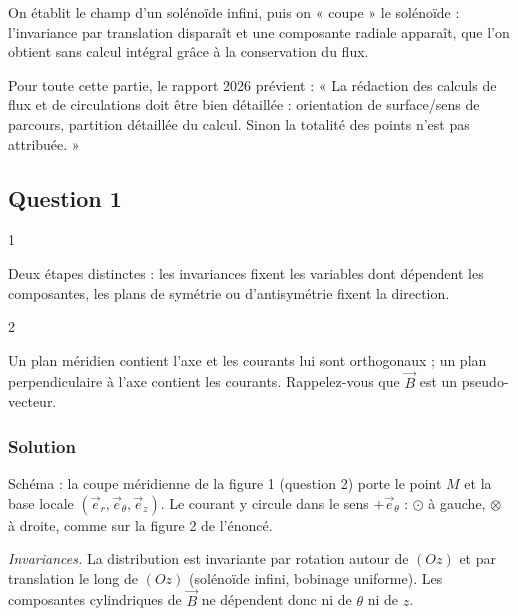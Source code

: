 \documentclass[11pt,a4paper]{article}
\begin{document}
On établit le champ d'un solénoïde infini, puis on « coupe » le solénoïde : l'invariance par translation disparaît et une composante radiale apparaît, que l'on obtient sans calcul intégral grâce à la conservation du flux.

\begin{jury}

Pour toute cette partie, le rapport 2026 prévient : « La rédaction des calculs de flux et de circulations doit être bien détaillée : orientation de surface/sens de parcours, partition détaillée du calcul. Sinon la totalité des points n'est pas attribuée. »

\end{jury}

\hypertarget{question-1}{%
\subsection{Question 1}\label{question-1}}

\begin{indication}{1}

Deux étapes distinctes : les invariances fixent les variables dont dépendent les composantes, les plans de symétrie ou d'antisymétrie fixent la direction.

\end{indication}

\begin{indication}{2}

Un plan méridien contient l'axe et les courants lui sont orthogonaux ; un plan perpendiculaire à l'axe contient les courants. Rappelez-vous que \(\vec B\) est un pseudo-vecteur.

\end{indication}

\hypertarget{solution}{%
\subsubsection{Solution}\label{solution}}

Schéma : la coupe méridienne de la figure 1 (question 2) porte le point \(M\) et la base locale \((\vec e_r,\vec e_\theta,\vec e_z)\).
Le courant y circule dans le sens \(+\vec e_\theta\) : \(\odot\) à gauche, \(\otimes\) à droite, comme sur la figure 2 de l'énoncé.

\emph{Invariances.} La distribution est invariante par rotation autour de \((Oz)\) et par translation le long de \((Oz)\) (solénoïde infini, bobinage uniforme). Les composantes cylindriques de \(\vec B\) ne dépendent donc ni de \(\theta\) ni de \(z\).
\end{document}
